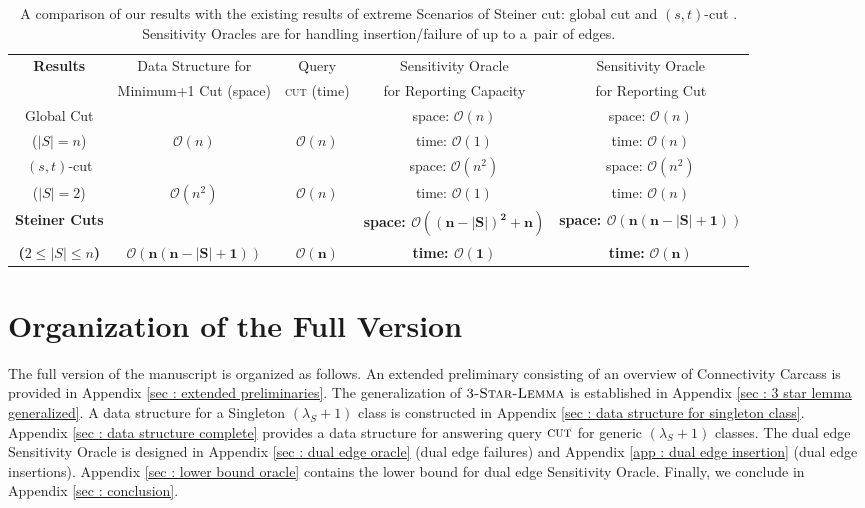 \documentclass[letterpaper,11pt]{article}
\begin{document}
\begin{table}[H]
\small
    \centering
    \begin{tabular}{|c|c|c|c|c|}
        \hline
         \textbf{Results} & Data Structure for & Query & Sensitivity Oracle & Sensitivity Oracle \\
         \textbf{} & Minimum+1 Cut (space) & \textsc{cut} (time) & for Reporting Capacity & for Reporting Cut \\
\hline
           Global Cut \cite{DBLP:conf/stoc/DinitzN95}  &  &  & space: ${\mathcal O}(n)$ & space: ${\mathcal O}(n)$ \\
          ($|S|=n$) &  ${\mathcal O}(n)$ &  ${\mathcal O}(n)$ & time: ${\mathcal O}(1)$ & time: ${\mathcal O}(n)$\\
        
         \hline
         $(s,t)$-cut \cite{DBLP:journals/talg/BaswanaBP23} &   &  &  space: ${\mathcal O}(n^2)$ & space: ${\mathcal O}(n^2)$\\
          ($|S|=2$) & ${\mathcal O}(n^2)$ & ${\mathcal O}(n)$ & time: ${\mathcal O}(1)$ & time: ${\mathcal O}(n)$ \\
         \hline
        {\color{blue}\textbf{Steiner Cuts}} &  &  & {\color{blue}\textbf{space: $\mathbf{{\mathcal O}((n-|S|)^2+n)}$}} & {\color{blue}\textbf{space: $\mathbf{{\mathcal O}(n(n-|S|+1))}$}}  \\
        {\color{blue}\textbf{($2\le |S| \le n$)}} & {\color{blue} $\mathbf{{\mathcal O}(n(n-|S|+1))}$} & {\color{blue}$\mathbf{{\mathcal O}(n)}$} & {\color{blue}\textbf{time: $\mathbf{{\mathcal O}(1)}$}} & {\color{blue}\textbf{time:} $\mathbf{{\mathcal O}(n)}$}  \\
         \hline
    \end{tabular}    
    \caption{A comparison of our results with the existing results of extreme Scenarios of Steiner cut: global cut \cite{DBLP:conf/stoc/DinitzN95} and $(s,t)$-cut \cite{DBLP:journals/talg/BaswanaBP23}. Sensitivity Oracles are for handling insertion/failure of up to a pair of edges.}
    \label{tab : results}
\end{table}


\newpage
\section{Organization of the Full Version}
The full version of the manuscript is organized as follows. An extended preliminary consisting of an overview of Connectivity Carcass is provided in Appendix \ref{sec : extended preliminaries}. The generalization of $\textsc{3-Star-Lemma}$ is established in Appendix \ref{sec : 3 star lemma generalized}. A data structure for a Singleton $(\lambda_S+1)$ class is constructed in Appendix \ref{sec : data structure for singleton class}. Appendix \ref{sec : data structure complete} provides a data structure for answering query $\textsc{cut}$ for generic $(\lambda_S+1)$ classes. The dual edge Sensitivity Oracle is designed in Appendix \ref{sec : dual edge oracle} (dual edge failures) and Appendix \ref{app : dual edge insertion} (dual edge insertions). Appendix \ref{sec : lower bound oracle} contains the lower bound for dual edge Sensitivity Oracle. Finally, we conclude in Appendix \ref{sec : conclusion}. 
\end{document}
